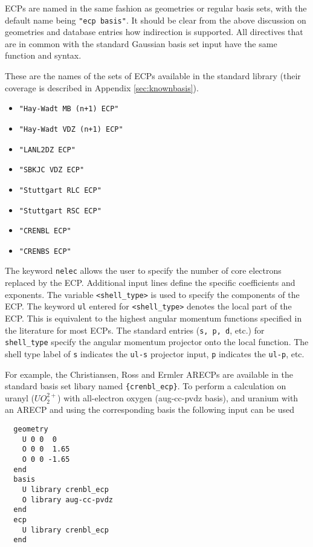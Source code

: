 ECPs are named in the same fashion as geometries or regular basis
sets, with the default name being \verb+"ecp basis"+.  It should be
clear from the above discussion on geometries and database entries how
indirection is supported.  All directives that are in common with the
standard Gaussian basis set input have the same function and syntax.

These are the names of the sets of ECPs available in the standard
library (their coverage is described in Appendix \ref{sec:knownbasis}).
\begin{itemize}
\item \verb,"Hay-Wadt MB (n+1) ECP",
\item \verb,"Hay-Wadt VDZ (n+1) ECP",
\item \verb+"LANL2DZ ECP"+
\item \verb+"SBKJC VDZ ECP"+
\item \verb+"Stuttgart RLC ECP"+
\item \verb+"Stuttgart RSC ECP"+
\item \verb+"CRENBL ECP"+
\item \verb+"CRENBS ECP"+
\end{itemize}

The keyword \verb+nelec+ allows the user to specify the number of core
electrons replaced by the ECP.  Additional input lines define the
specific coefficients and exponents.  The variable \verb+<shell_type>+
is used to specify the components of the ECP.  The keyword \verb+ul+
entered for \verb+<shell_type>+ denotes the local part of the ECP.
This is equivalent to the highest angular momentum functions specified
in the literature for most ECPs.  The standard entries (\verb+s, p, d+,
etc.) for \verb+shell_type+ specify the angular momentum projector
onto the local function.  The shell type label of \verb+s+ indicates
the \verb+ul-s+ projector input, \verb+p+ indicates the \verb+ul-p+,
etc.

For example, the Christiansen, Ross and Ermler ARECPs are available in
the standard basis set libary named \verb+{crenbl_ecp}+.  To perform a
calculation on uranyl ($UO_2^{2+}$) with all-electron oxygen
(aug-cc-pvdz basis), and uranium with an ARECP and using the
corresponding basis the following input can be used
\begin{verbatim}
  geometry
    U 0 0  0
    O 0 0  1.65
    O 0 0 -1.65
  end
  basis 
    U library crenbl_ecp
    O library aug-cc-pvdz
  end
  ecp
    U library crenbl_ecp
  end
\end{verbatim}

